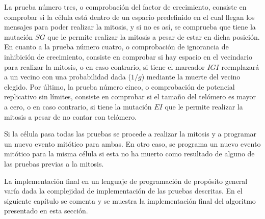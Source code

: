 La prueba número tres, o comprobación del factor de crecimiento, consiste en comprobar
si la célula está dentro de un espacio predefinido en el cual llegan los mensajes
para poder realizar la mitosis, y si no es así, se comprueba que tiene la mutación $SG$
que le permite realizar la mitosis a pesar de estar en dicha posición. En cuanto a la prueba
número cuatro, o comprobación de ignorancia de inhibición de crecimiento, consiste en comprobar
si hay espacio en el vecindario para realizar la mitosis, o en caso contrario, si tiene el marcador
$IGI$ reemplazará a un vecino con una probabilidad dada ($1/g$) mediante la muerte del vecino elegido.
Por último, la prueba número cinco, o comprobación de potencial replicativo sin límites,
consiste en comprobar si el tamaño del telómero es mayor a cero, o en caso contrario,
si tiene la mutación $EI$ que le permite realizar la mitosis a pesar de no contar con telómero.

Si la célula pasa todas las pruebas se procede a realizar la mitosis y a programar un nuevo evento mitótico para ambas.
En otro caso, se programa un nuevo evento mitótico para la misma célula si esta no ha muerto como
resultado de alguno de las pruebas previas a la mitosis.

La implementación final en un lenguaje de programación de propósito general varía dada
la complejidad de implementación de las pruebas descritas. En el siguiente capítulo se comenta y se muestra
la implementación final del algoritmo presentado en esta sección.
